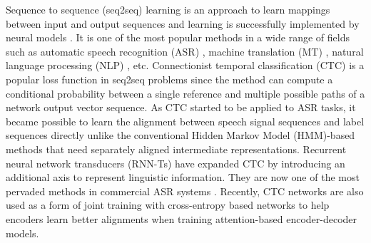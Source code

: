 \documentclass[review]{elsarticle}
\begin{document}
Sequence to sequence (seq2seq) learning is an approach to learn mappings between input and output sequences and learning is successfully implemented by neural models \citep{DBLP:conf/nips/SutskeverVL14}.
It is one of the most popular methods in a wide range of fields such as automatic speech recognition (ASR) \citep{DBLP:conf/icassp/ChanJLV16, DBLP:conf/icassp/HeSPMAZRKWPLBSL19, DBLP:conf/asru/KimJLHKLGPKJLYK19, DBLP:conf/asru/MoritzHR19}, machine translation (MT) \citep{DBLP:journals/corr/BahdanauCB14, DBLP:conf/interspeech/JiaWBMJCW19}, natural language processing (NLP) \citep{DBLP:conf/ijcai/YinJLSLL16}, etc.
Connectionist temporal classification (CTC) \citep{DBLP:conf/icml/GravesFGS06} is a popular loss function in seq2seq problems since the method can compute a conditional probability between a single reference and multiple possible paths of a network output vector sequence.
As CTC started to be applied to ASR tasks, it became possible to learn the alignment between speech signal sequences and label sequences directly unlike the conventional Hidden Markov Model (HMM)-based methods \citep{18626} that need separately aligned intermediate representations.
Recurrent neural network transducers (RNN-Ts) \citep{DBLP:conf/icassp/GravesMH13} have expanded CTC by introducing an additional axis to represent linguistic information. They are now one of the most pervaded methods in commercial ASR systems \citep{DBLP:conf/icassp/HeSPMAZRKWPLBSL19}.
Recently, CTC networks are also used as a form of joint training \citep{DBLP:conf/asru/KimJLHKLGPKJLYK19, DBLP:conf/asru/MoritzHR19} with cross-entropy based networks to help encoders learn better alignments when training attention-based encoder-decoder models.
\end{document}
